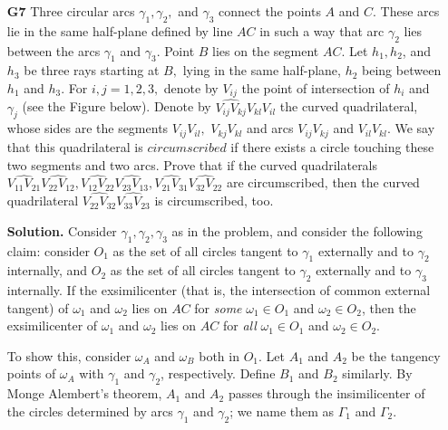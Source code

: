 \documentclass[11pt]{article}
\newcommand{\<}{\langle}
\renewcommand{\>}{\rangle}
\begin{document}
\begin{enumerate}
	\item [\textbf{G7}] Three circular arcs $\gamma_1, \gamma_2,$ and $\gamma_3$ connect the points $A$ and $C.$ These arcs lie in the same half-plane defined by line $AC$ in such a way that arc $\gamma_2$ lies between the arcs $\gamma_1$ and $\gamma_3.$ Point $B$ lies on the segment $AC.$ Let $h_1, h_2$, and $h_3$ be three rays starting at $B,$ lying in the same half-plane, $h_2$ being between $h_1$ and $h_3.$ For $i, j = 1, 2, 3,$ denote by $V_{ij}$ the point of intersection of $h_i$ and $\gamma_j$ (see the Figure below). Denote by $\widehat{V_{ij}V_{kj}}\widehat{V_{kl}V_{il}}$ the curved quadrilateral, whose sides are the segments $V_{ij}V_{il},$ $V_{kj}V_{kl}$ and arcs $V_{ij}V_{kj}$ and $V_{il}V_{kl}.$ We say that this quadrilateral is $circumscribed$ if there exists a circle touching these two segments and two arcs. Prove that if the curved quadrilaterals $\widehat{V_{11}V_{21}}\widehat{V_{22}V_{12}}, \widehat{V_{12}V_{22}}\widehat{V_{23}V_{13}},\widehat{V_{21}V_{31}}\widehat{V_{32}V_{22}}$ are circumscribed, then the curved quadrilateral $\widehat{V_{22}V_{32}}\widehat{V_{33}V_{23}}$ is circumscribed, too.
	
	\textbf{Solution.} 
	Consider $\gamma_1, \gamma_2, \gamma_3$ as in the problem, and consider the following claim: consider $O_1$ as the set of all circles tangent to $\gamma_1$ externally and to $\gamma_2$ internally, and $O_2$ as the set of all circles tangent to $\gamma_2$ externally and to $\gamma_3$ internally. If the exsimilicenter (that is, the intersection of common external tangent) of $\omega_1$ and $\omega_2$ lies on $AC$ for \emph{some} $\omega_1\in O_1$ and $\omega_2\in O_2$, then the exsimilicenter of $\omega_1$ and $\omega_2$ lies on $AC$ for \emph{all} $\omega_1\in O_1$ and $\omega_2\in O_2$. 
	
	To show this, consider $\omega_A$ and $\omega_B$ both in $O_1$. Let $A_1$ and $A_2$ be the tangency points of $\omega_A$ with $\gamma_1$ and $\gamma_2$, respectively. Define $B_1$ and $B_2$ similarly. By Monge Alembert's theorem, $A_1$ and $A_2$ passes through the insimilicenter of the circles determined by arcs $\gamma_1$ and $\gamma_2$; we name them as $\Gamma_1$ and $\Gamma_2$. 
	

\end{enumerate}
\end{document}
